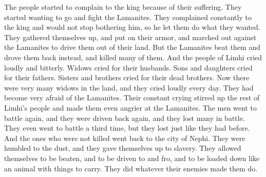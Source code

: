 The people started to complain to the king because of their suffering. They started wanting to go and fight the Lamanites. They complained constantly to the king and would not stop bothering him, so he let them do what they wanted.
\bverse \iffalse And they gathered themselves together again, and put on their armor, and went forth against the Lamanites to drive them out of their land. \fi
They gathered themselves up, and put on their armor, and marched out against the Lamanites to drive them out of their land.
\bverse \iffalse And it came to pass that the Lamanites did beat them, and drove them back, and slew many of them. \fi
But the Lamanites beat them and drove them back instead, and killed many of them.
\bverse \iffalse And now there was a great mourning and lamentation among the people of Limhi, the widow mourning for her husband, the son and the daughter mourning for their father, and the brothers for their brethren. \fi
And the people of Limhi cried loudly and bitterly. Widows cried for their husbands. Sons and daughters cried for their fathers. Sisters and brothers cried for their dead brothers.
\bverse \iffalse Now there were a great many widows in the land, and they did cry mightily from day to day, for a great fear of the Lamanites had come upon them. \fi
Now there were very many widows in the land, and they cried loudly every day. They had become very afraid of the Lamanites.
\bverse \iffalse And it came to pass that their continual cries did stir up the remainder of the people of Limhi to anger against the Lamanites; and they went again to battle, but they were driven back again, suffering much loss. \fi
Their constant crying stirred up the rest of Limhi's people and made them even angrier at the Lamanites. The men went to battle again, and they were driven back again, and they lost many in battle.
\bverse \iffalse Yea, they went again even the third time, and suffered in the like manner; and those that were not slain returned again to the city of Nephi. \fi
They even went to battle a third time, but they lost just like they had before. And the ones who were not killed went back to the city of Nephi.
\bverse \iffalse And they did humble themselves even to the dust, subjecting themselves to the yoke of bondage, submitting themselves to be smitten, and to be driven to and fro, and burdened, according to the desires of their enemies. \fi
They were humbled to the dust, and they gave themselves up to slavery. They allowed themselves to be beaten, and to be driven to and fro, and to be loaded down like an animal with things to carry. They did whatever their enemies made them do.
